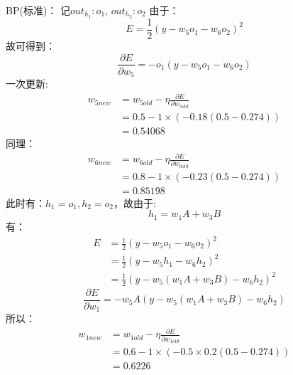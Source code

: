 \documentclass[UTF8,a4paper,AutoFakeBold,AutoFakeSlant]{article}
\begin{document}
BP(标准)：
记$out_{h_1}: o_1$, $out_{h_2}: o_2$
由于：
\begin{equation*}
  E = \frac{1}{2} (y - w_5 o_1 -w_6 o_2 )^2
\end{equation*}
故可得到：
\begin{equation*}
  \frac{\partial E}{\partial w_5} = -o_1(y - w_5 o_1 -w_6 o_2 )
\end{equation*}
一次更新:
\begin{equation*}
  \begin{aligned}
    w_{5new} & = w_{5old} - \eta \frac{\partial E}{\partial w_{5old}} \\
             & = 0.5 - 1\times (-0.18(0.5-0.274))                     \\
             & = 0.54068
  \end{aligned}
\end{equation*}
同理：
\begin{equation*}
  \begin{aligned}
    w_{6new} & = w_{6old} - \eta \frac{\partial E}{\partial w_{6old}} \\
             & = 0.8 - 1\times (-0.23(0.5-0.274))                     \\
             & = 0.85198
  \end{aligned}
\end{equation*}
此时有：$h_1=o_1,h_2=o_2$，故由于:
\begin{equation*}
  h_1 = w_1A+w_3B
\end{equation*}
有：
\begin{equation*}
  \begin{aligned}
    E & = \frac{1}{2} (y - w_5 o_1 -w_6 o_2 )^2         \\
      & = \frac{1}{2} (y - w_5 h_1 -w_6 h_2 )^2         \\
      & = \frac{1}{2} (y - w_5 (w_1A+w_3B) -w_6 h_2 )^2
  \end{aligned}
\end{equation*}
\begin{equation*}
  \frac{\partial E}{\partial w_1} = -w_5A(y - w_5 (w_1A+w_3B) -w_6 h_2)
\end{equation*}
所以：
\begin{equation*}
  \begin{aligned}
    w_{1new} & = w_{1old} - \eta\frac{\partial E}{\partial w_{1old}} \\
             & = 0.6 - 1\times (-0.5\times 0.2(0.5 - 0.274))         \\
             & = 0.6226
  \end{aligned}
\end{equation*}
\end{document}

